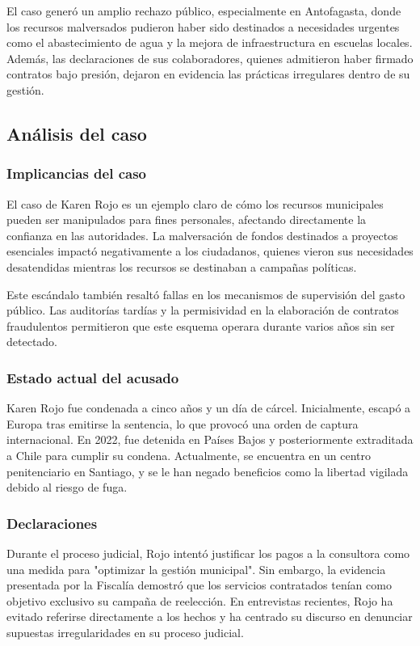 \documentclass[letter,12pt]{article}
\begin{document}
	El caso generó un amplio rechazo público, especialmente en Antofagasta, donde los recursos malversados pudieron haber sido destinados a necesidades urgentes como el abastecimiento de agua y la mejora de infraestructura en escuelas locales. Además, las declaraciones de sus colaboradores, quienes admitieron haber firmado contratos bajo presión, dejaron en evidencia las prácticas irregulares dentro de su gestión.\cite{karen}
	
	\subsection{Análisis del caso}
	\subsubsection{Implicancias del caso}
	El caso de Karen Rojo es un ejemplo claro de cómo los recursos municipales pueden ser manipulados para fines personales, afectando directamente la confianza en las autoridades. La malversación de fondos destinados a proyectos esenciales impactó negativamente a los ciudadanos, quienes vieron sus necesidades desatendidas mientras los recursos se destinaban a campañas políticas.
	
	Este escándalo también resaltó fallas en los mecanismos de supervisión del gasto público. Las auditorías tardías y la permisividad en la elaboración de contratos fraudulentos permitieron que este esquema operara durante varios años sin ser detectado.
	
	\subsubsection{Estado actual del acusado}
	Karen Rojo fue condenada a cinco años y un día de cárcel. Inicialmente, escapó a Europa tras emitirse la sentencia, lo que provocó una orden de captura internacional. En 2022, fue detenida en Países Bajos y posteriormente extraditada a Chile para cumplir su condena. Actualmente, se encuentra en un centro penitenciario en Santiago, y se le han negado beneficios como la libertad vigilada debido al riesgo de fuga.
	
	\subsubsection{Declaraciones}
	Durante el proceso judicial, Rojo intentó justificar los pagos a la consultora como una medida para "optimizar la gestión municipal". Sin embargo, la evidencia presentada por la Fiscalía demostró que los servicios contratados tenían como objetivo exclusivo su campaña de reelección. En entrevistas recientes, Rojo ha evitado referirse directamente a los hechos y ha centrado su discurso en denunciar supuestas irregularidades en su proceso judicial.
	
\end{document}
